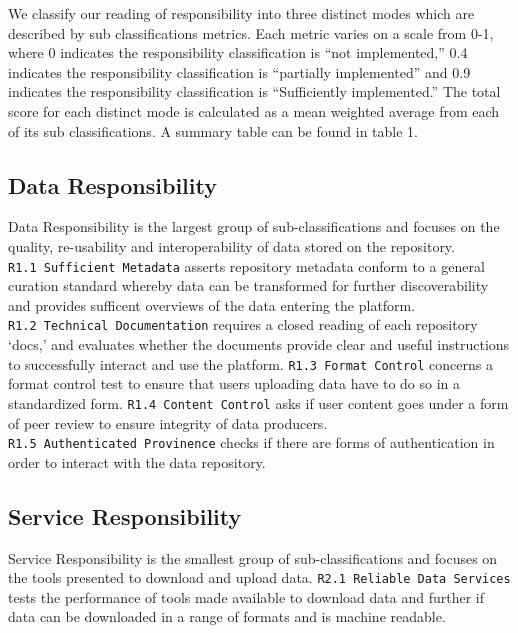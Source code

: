 \documentclass{article}
\begin{document}
We classify our reading of responsibility into three distinct modes
which are described by sub classifications metrics. Each metric varies
on a scale from 0-1, where 0 indicates the responsibility classification
is ``not implemented,'' 0.4 indicates the responsibility classification
is ``partially implemented'' and 0.9 indicates the responsibility
classification is ``Sufficiently implemented.'' The total score for each
distinct mode is calculated as a mean weighted average from each of its
sub classifications. A summary table can be found in table 1.

\hypertarget{data-responsibility}{%
\subsection{Data Responsibility}\label{data-responsibility}}

Data Responsibility is the largest group of sub-classifications and
focuses on the quality, re-usability and interoperability of data stored
on the repository. \texttt{R1.1\ Sufficient\ Metadata} asserts
repository metadata conform to a general curation standard whereby data
can be transformed for further discoverability and provides sufficent
overviews of the data entering the platform.
\texttt{R1.2\ Technical\ Documentation} requires a closed reading of
each repository `docs,' and evaluates whether the documents provide
clear and useful instructions to successfully interact and use the
platform. \texttt{R1.3\ Format\ Control} concerns a format control test
to ensure that users uploading data have to do so in a standardized
form. \texttt{R1.4\ Content\ Control} asks if user content goes under a
form of peer review to ensure integrity of data producers.
\texttt{R1.5\ Authenticated\ Provinence} checks if there are forms of
authentication in order to interact with the data repository.

\hypertarget{service-responsibility}{%
\subsection{Service Responsibility}\label{service-responsibility}}

Service Responsibility is the smallest group of sub-classifications and
focuses on the tools presented to download and upload data.
\texttt{R2.1\ Reliable\ Data\ Services} tests the performance of tools
made available to download data and further if data can be downloaded in
a range of formats and is machine readable.
\end{document}
